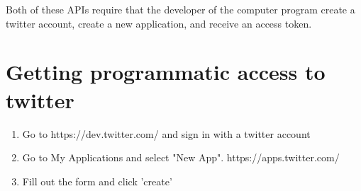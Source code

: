 \documentclass{article}\usepackage[]{graphicx}\usepackage[]{color}
\begin{document}
Both of these APIs require that the developer of the computer program create a twitter account, create a new application, and receive an access token.

\section*{Getting programmatic access to twitter}
\begin{enumerate}
  \item Go to https://dev.twitter.com/ and sign in with a twitter account
  \item Go to My Applications and select "New App". https://apps.twitter.com/
  \item Fill out the form and click 'create'
\end{enumerate}
\end{document}
